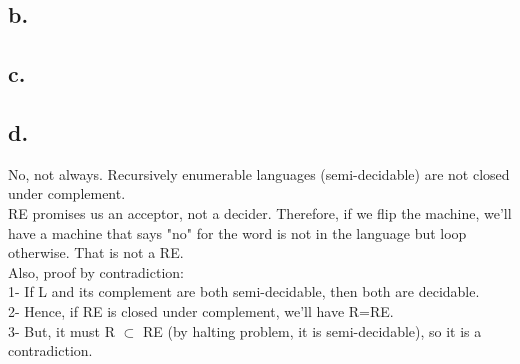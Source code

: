 \documentclass[12pt]{article}
\begin{document}
\subsection*{b.}

\subsection*{c.}

\subsection*{d.}
No, not always. Recursively enumerable languages (semi-decidable) are not closed under complement.\\
RE promises us an acceptor, not a decider. Therefore, if we flip the machine, we'll have a machine that says "no" for the word is not in the language but loop otherwise. That is not a RE.\\
Also, proof by contradiction:\\
1- If L and its complement are both semi-decidable, then both are decidable.\\
2- Hence, if RE is closed under complement, we'll have R=RE.\\
3- But, it must R $\subset$ RE (by halting problem, it is semi-decidable), so it is a contradiction.

\end{document}
